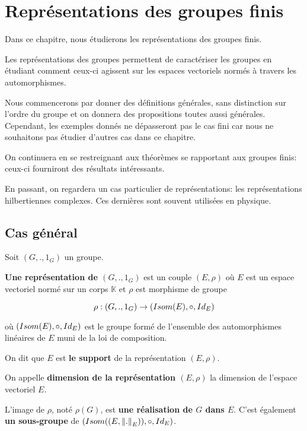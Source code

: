 \chapter{Représentations des groupes finis}

Dans ce chapitre, nous étudierons les représentations des groupes finis.

Les représentations des groupes permettent de caractériser les groupes en
étudiant comment ceux-ci agissent sur les espaces vectoriels normés à travers
les automorphismes.

Nous commencerons par donner des définitions générales, sans distinction sur
l'ordre du groupe et on donnera des propositions toutes aussi générales.
Cependant, les exemples donnés ne dépasseront pas le cas fini car nous ne
souhaitons pas étudier d'autres cas dans ce chapitre.

On continuera en se restreignant aux théorèmes se rapportant aux groupes finis:
ceux-ci fourniront des résultats intéressants.

En passant, on regardera un cas particulier de représentations: les
représentations hilbertiennes complexes. Ces dernières sont souvent utilisées en
physique.

\section{Cas général}

\begin{definition} 
	Soit $(G, ., 1_{G})$ un groupe.

	\textbf{Une représentation de $(G, ., 1_{G})$} est un couple $(E,
	\rho)$ où $E$
	est un espace vectoriel normé sur un corps $\mathbb{K}$ et $\rho$
	est morphisme de groupe

	\begin{equation}
		\rho : (G, ., 1_{G}) \rightarrow (Isom(E), \circ, Id_{E})
		\label{definition_representation}
	\end{equation}

	où $(Isom(E), \circ, Id_{E})$ est le groupe formé de l'ensemble
	des automorphismes linéaires de $E$ muni de la loi de
	composition.

	On dit que $E$ est \textbf{le support} de la
	représentation $(E, \rho)$.

	On appelle \textbf{dimension de la représentation $(E, \rho)$} la dimension
	de l'espace vectoriel $E$.

	L'image de $\rho$, noté $\rho(G)$, est \textbf{une réalisation de $G$ dans
		$E$}.
	C'est également \textbf{un sous-groupe} de $(Isom((E,
		\norm{.}_{E})), \circ, Id_{E})$.
\end{definition}

